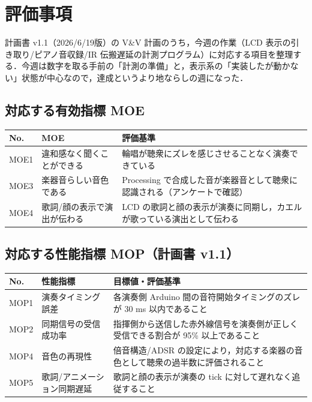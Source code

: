 \documentclass[a4paper,11pt]{ltjsarticle}
\providecommand{\％}{\%}
\begin{document}
\section{評価事項}\label{sec:evaluation}

計画書 v1.1（2026/6/19版）の V\&V 計画のうち，今週の作業（LCD 表示の引き取り/ピアノ音収録/IR 伝搬遅延の計測プログラム）に対応する項目を整理する．今週は数字を取る手前の「計測の準備」と，表示系の「実装したが動かない」状態が中心なので，達成というより地ならしの週になった．

\subsection{対応する有効指標 MOE}\label{sec:moe}

\begin{longtable}{|p{1.2cm}|p{4cm}|p{8cm}|}
\hline
\rowcolor[gray]{0.9}
No. & MOE & 評価基準 \\
\hline
MOE1 & 違和感なく聞くことができる & 輪唱が聴衆にズレを感じさせることなく演奏できている \\
\hline
MOE3 & 楽器音らしい音色である & Processing で合成した音が楽器音として聴衆に認識される（アンケートで確認） \\
\hline
MOE4 & 歌詞/顔の表示で演出が伝わる & LCD の歌詞と顔の表示が演奏に同期し，カエルが歌っている演出として伝わる \\
\hline
\end{longtable}

\subsection{対応する性能指標 MOP（計画書 v1.1）}\label{sec:mop}

\begin{longtable}{|p{1.2cm}|p{3.8cm}|p{8.8cm}|}
\hline
\rowcolor[gray]{0.9}
No. & 性能指標 & 目標値・評価基準 \\
\hline
MOP1 & 演奏タイミング誤差 & 各演奏側 Arduino 間の音符開始タイミングのズレが 30 ms 以内であること \\
\hline
MOP2 & 同期信号の受信成功率 & 指揮側から送信した赤外線信号を演奏側が正しく受信できる割合が 95\% 以上であること \\
\hline
MOP4 & 音色の再現性 & 倍音構造/ADSR の設定により，対応する楽器の音色として聴衆の過半数に評価されること \\
\hline
MOP5 & 歌詞/アニメーション同期遅延 & 歌詞と顔の表示が演奏の tick に対して遅れなく追従すること \\
\hline
\end{longtable}
\end{document}
